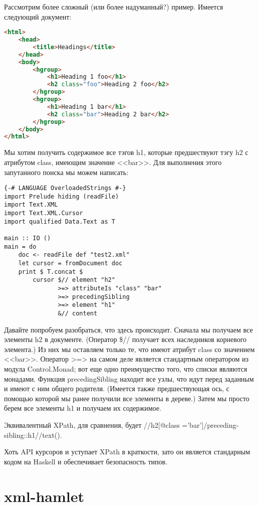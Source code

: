 Рассмотрим более сложный (или более надуманный?) пример. Имеется следующий документ:

\begin{lstlisting}[language=HTML]
  <html>
    <head>
        <title>Headings</title>
    </head>
    <body>
        <hgroup>
            <h1>Heading 1 foo</h1>
            <h2 class="foo">Heading 2 foo</h2>
        </hgroup>
        <hgroup>
            <h1>Heading 1 bar</h1>
            <h2 class="bar">Heading 2 bar</h2>
        </hgroup>
    </body>
</html>
\end{lstlisting}

Мы хотим получить содержимое все тэгов h1, которые предшествуют тэгу h2 с атрибутом class, имеющим значение <<bar>>. Для выполнения этого запутанного поиска мы можем написать:

\begin{lstlisting}
{-# LANGUAGE OverloadedStrings #-}
import Prelude hiding (readFile)
import Text.XML
import Text.XML.Cursor
import qualified Data.Text as T

main :: IO ()
main = do
    doc <- readFile def "test2.xml"
    let cursor = fromDocument doc
    print $ T.concat $
        cursor $// element "h2"
               >=> attributeIs "class" "bar"
               >=> precedingSibling
               >=> element "h1"
               &// content
\end{lstlisting}%

Давайте попробуем разобраться, что здесь происходит. Сначала мы получаем все элементы h2 в документе. (Оператор \$// получает всех наследников корневого элемента.) Из них мы оставляем только те, что имеют атрибут class со значением <<bar>>. Оператор >=> на самом деле является стандартным оператором из модула Control.Monad; вот еще одно преимущество того, что списки являются монадами. Функция precedingSibling находит все узлы, что идут перед заданным и имеют с ним общего родителя. (Имеется также предшествующая ось, с помощью которой мы ранее получили все элементы в дереве.) Затем мы просто берем все элементы h1 и получаем их содержимое.

\begin{remark}
Эквивалентный XPath, для сравнения, будет //h2[@class ='bar']/preceding-sibling::h1//text().
\end{remark}

Хоть API курсоров и уступает XPath в краткости, зато он является стандарным кодом на Haskell и обеспечивает безопасность типов.

\section{xml-hamlet}

